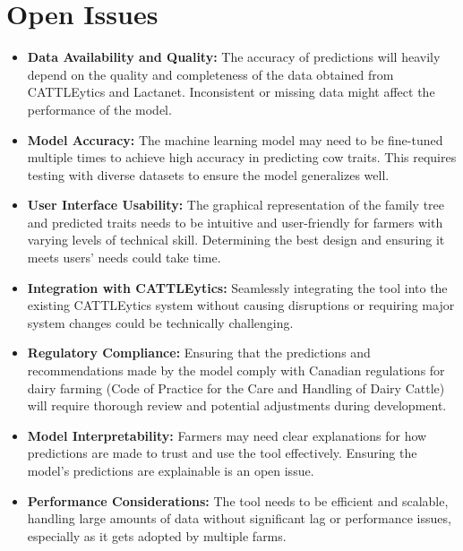 \documentclass[12pt]{article}
\begin{document}
\section{Open Issues}
\begin{itemize}
	\item \textbf{Data Availability and Quality:} The accuracy of predictions will
	      heavily depend on the quality and completeness of the data obtained from
	      CATTLEytics and Lactanet. Inconsistent or missing data might affect the
	      performance of the model.
	      
	\item \textbf{Model Accuracy:} The machine learning model may need to be
	      fine-tuned multiple times to achieve high accuracy in predicting cow
	      traits. This requires testing with diverse datasets to ensure the model
	      generalizes well.
	      
	\item \textbf{User Interface Usability:} The graphical representation of the
	      family tree and predicted traits needs to be intuitive and user-friendly
	      for farmers with varying levels of technical skill. Determining the best
	      design and ensuring it meets users' needs could take time.
	      
	\item \textbf{Integration with CATTLEytics:} Seamlessly integrating the tool
	      into the existing CATTLEytics system without causing disruptions or
	      requiring major system changes could be technically challenging.
	      
	\item \textbf{Regulatory Compliance:} Ensuring that the predictions and
	      recommendations made by the model comply with Canadian regulations for
	      dairy farming (Code of Practice for the Care and Handling of Dairy
	      Cattle) will require thorough review and potential adjustments during
	      development.
	      
	\item \textbf{Model Interpretability:} Farmers may need clear explanations for
	      how predictions are made to trust and use the tool effectively. Ensuring
	      the model’s predictions are explainable is an open issue.
	      
	\item \textbf{Performance Considerations:} The tool needs to be efficient and
	      scalable, handling large amounts of data without significant lag or
	      performance issues, especially as it gets adopted by multiple farms.
\end{itemize}
\end{document}
